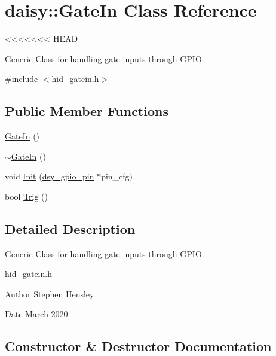 \hypertarget{classdaisy_1_1_gate_in}{}\section{daisy\+:\+:Gate\+In Class Reference}
\label{classdaisy_1_1_gate_in}
<<<<<<< HEAD


Generic Class for handling gate inputs through G\+P\+IO.  




{\ttfamily \#include $<$hid\+\_\+gatein.\+h$>$}

\subsection*{Public Member Functions}
\begin{DoxyCompactItemize}
\item 
\hyperlink{classdaisy_1_1_gate_in_a0ee9c8b8015845e9ac290f1de287ce03}{Gate\+In} ()
\item 
\hyperlink{classdaisy_1_1_gate_in_af38fd662789d9d746f184703a2998f80}{$\sim$\+Gate\+In} ()
\item 
void \hyperlink{classdaisy_1_1_gate_in_ab8f9cff6bcb78ec631cfa0d026c7f3b7}{Init} (\hyperlink{structdsy__gpio__pin}{dsy\+\_\+gpio\+\_\+pin} $\ast$pin\+\_\+cfg)
\item 
bool \hyperlink{classdaisy_1_1_gate_in_a6a9bac9fe44985baa7097bd47a90a40f}{Trig} ()
\end{DoxyCompactItemize}


\subsection{Detailed Description}
Generic Class for handling gate inputs through G\+P\+IO. 

\hyperlink{hid__gatein_8h_source}{hid\+\_\+gatein.\+h} \begin{DoxyAuthor}{Author}
Stephen Hensley 
\end{DoxyAuthor}
\begin{DoxyDate}{Date}
March 2020 
\end{DoxyDate}


\subsection{Constructor \& Destructor Documentation}
\mbox{\label{classdaisy_1_1_gate_in_a0ee9c8b8015845e9ac290f1de287ce03}} 
